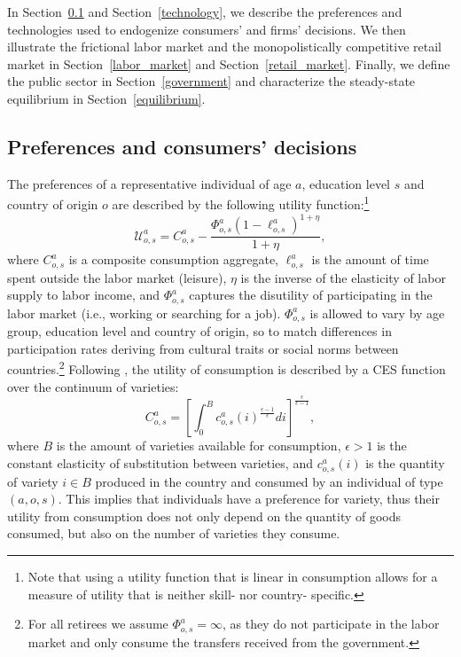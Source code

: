 \documentclass[a4paper,12pt]{article}
\begin{document}
In Section~\ref{preferences} and Section~\ref{technology}, we describe the preferences and technologies
used to endogenize consumers' and firms' decisions. We then illustrate the
frictional labor market and the monopolistically competitive retail market
in Section~\ref{labor_market} and Section~\ref{retail_market}. Finally, we define the public sector in Section~\ref{government} and characterize the steady-state equilibrium in Section~\ref{equilibrium}.

\subsection{Preferences and consumers' decisions} \label{preferences}

The preferences of a representative individual of age $a$, education level $%
s $ and country of origin $o$ are described by the following utility
function:\footnote{Note that using a utility function that is linear in consumption allows for a measure of utility that is neither skill- nor country- specific.} 
\begin{equation}
\mathcal{U}_{o,s}^{a}=C_{o,s}^{a}-\frac{\Phi _{o,s}^{a}(1-\ell
_{o,s}^{a})^{1+\eta }}{1+\eta },  \label{Eq:Utility}
\end{equation}%
where $C_{o,s}^{a}$ is a composite consumption aggregate, $\ell _{o,s}^{a}$
is the amount of time spent outside the labor market (leisure), $\eta $ is
the inverse of the elasticity of labor supply to labor income, and $\Phi
_{o,s}^{a}$ captures the disutility of participating in the labor market
(i.e., working or searching for a job). $\Phi _{o,s}^{a}$ is allowed to vary
by age group, education level and country of origin, so to match differences
in participation rates deriving from cultural traits or social norms between
countries.\footnote{%
For all retirees we assume $\Phi _{o,s}^{a}=\infty $, as they do not
participate in the labor market and only consume the transfers received from
the government.} Following \citet{Krugman1980}, the utility of consumption is
described by a CES function over the continuum of varieties: 
\begin{equation}
C_{o,s}^{a}=\left[ \int_{0}^{B}c_{o,s}^{a}(i)^{\frac{\epsilon -1}{\epsilon }%
}di\right] ^{\frac{\epsilon }{\epsilon -1}},  \label{Eq:CESGoods}
\end{equation}%
where $B$ is the amount of varieties available for consumption, $\epsilon >1$
is the constant elasticity of substitution between varieties, and $%
c_{o,s}^{a}(i)$ is the quantity of variety $i\in B$ produced in the
country and consumed by an individual of type $(a,o,s)$. This implies that
individuals have a preference for variety, thus their utility from
consumption does not only depend on the quantity of goods consumed, but also
on the number of varieties they consume.
\end{document}
